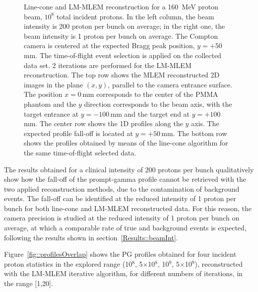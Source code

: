 \begin{figure}
\caption{Line-cone and LM-MLEM reconstruction for a 160~MeV proton beam, $10^{8}$ total incident protons. In the left column, the beam intensity is 200 proton per bunch on average; in the right one, the beam intensity is 1 proton per bunch on average. The Compton camera is centered at the expected Bragg peak position, $y=+50\,$mm. The time-of-flight event selection is applied on the collected data set. 2 iterations are performed for the LM-MLEM reconstruction. The top row shows the MLEM reconstructed 2D images in the plane $(x,y)$, parallel to the camera entrance surface. The position $x=0\,$mm corresponds to the center of the PMMA phantom and the $y$ direction corresponds to the beam axis, with the target entrance at $y=-100\,$mm and the target end at $y=+100\,$mm.  The center row shows the 1D profiles along the $y$ axis. The expected profile fall-off is located at $y=+50\,$mm. The bottom row shows the profiles obtained by means of the line-cone algorithm for the same time-of-flight selected data.}
\label{fig:comparison}
\end{figure}

The results obtained for a clinical intensity of 200 protons per bunch qualitatively show how the fall-off of the prompt-gamma profile cannot be retrieved with the two applied reconstruction methods, due to the contamination of background events. The fall-off can be identified at the reduced intensity of 1 proton per bunch for both line-cone and LM-MLEM reconstructed data.
For this reason, the camera precision is studied at the reduced intensity of 1 proton per bunch on average, at which a comparable rate of true and background events is expected, following the results shown in section~\ref{Results::beamInt}.

Figure~\ref{fig::profilesOverlap} shows the PG profiles obtained for four incident proton statistics in the explored range (10$^{8}$, 5$\times$10$^{8}$, 10$^{9}$, 5$\times$10$^{9}$), reconstructed with the LM-MLEM iterative algorithm, for different numbers of iterations, in the range [1,20].

